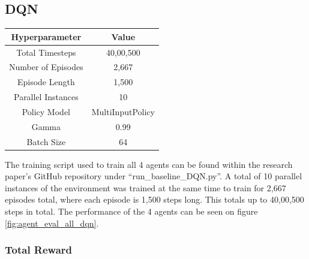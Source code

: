 \subsection{DQN}

\begin{center}
\begin{tabular}{ |c|c| } 
 \hline
 Hyperparameter & Value \\ 
 \hline
 Total Timesteps & 40,00,500 \\
 Number of Episodes &  2,667 \\
 Episode Length & 1,500 \\ 
 Parallel Instances & 10 \\
 Policy Model & MultiInputPolicy \\
 Gamma & 0.99 \\  
 Batch Size & 64 \\
 \hline
\end{tabular}
\end{center}

The training script used to train all 4 agents can be found within the research paper's GitHub repository under ``run\_baseline\_DQN.py''. A total of 10 parallel instances of the environment was trained at the same time to train for 2,667 episodes total, where each episode is 1,500 steps long. This totals up to 40,00,500 steps in total. The performance of the 4 agents can be seen on figure \ref{fig:agent_eval_all_dqn}. 


\subsubsection*{Total Reward}

